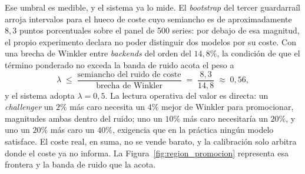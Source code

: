 Ese umbral es medible, y el sistema ya lo mide. El \textit{bootstrap} del tercer guardarraíl arroja intervalos para el hueco de coste cuyo semiancho es de aproximadamente $8{,}3$ puntos porcentuales sobre el panel de 500 series: por debajo de esa magnitud, el propio experimento declara no poder distinguir dos modelos por su coste. Con una brecha de Winkler entre \textit{backends} del orden del $14{,}8\%$, la condición de que el término ponderado no exceda la banda de ruido acota el peso a
\begin{equation}
    \lambda \;\leq\; \frac{\text{semiancho del ruido de coste}}{\text{brecha de Winkler}} \;=\; \frac{8{,}3}{14{,}8} \;\approx\; 0{,}56 ,
\end{equation}
y el sistema adopta $\lambda = 0{,}5$. La lectura operativa del valor es directa: un \textit{challenger} un $2\%$ más caro necesita un $4\%$ mejor de Winkler para promocionar, magnitudes ambas dentro del ruido; uno un $10\%$ más caro necesitaría un $20\%$, y uno un $20\%$ más caro un $40\%$, exigencia que en la práctica ningún modelo satisface. El coste real, en suma, no se vende barato, y la calibración solo arbitra donde el coste ya no informa. La Figura~\ref{fig:region_promocion} representa esa frontera y la banda de ruido que la acota.

